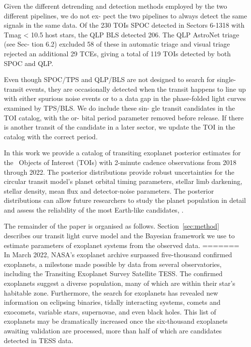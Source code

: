 \documentclass[floatfix,ApJL,twocolumn]{aastex631}
\begin{document}
Given the different detrending and detection methods employed by the two different pipelines, we do not ex- pect the two pipelines to always detect the same signals in the same data. Of the 230 TOIs SPOC detected in Sectors 6-1318 with Tmag < 10.5 host stars, the QLP BLS detected 206. The QLP AstroNet triage (see Sec- tion 6.2) excluded 58 of these in automatic triage and visual triage rejected an additional 29 TCEs, giving a total of 119 TOIs detected by both SPOC and QLP.

Even though SPOC/TPS and QLP/BLS are not designed to search for single-transit events, they are occasionally detected when the transit happens to line up with either spurious noise events or to a data gap in the phase-folded light curves examined by TPS/BLS. We do include these sin- gle transit candidates in the TOI catalog, with the or- bital period parameter removed before release. If there is another transit of the candidate in a later sector, we update the TOI in the catalog with the correct period.

In this work we provide a catalog of transiting exoplanet posterior estimates for the \red{\numAnalysed} \tess\ Objects of Interest (TOIs) with 2-minute cadence observations from 2018 through 2022.
The posterior distributions provide robust uncertainties for the circular transit model's planet orbital timing parameters, stellar limb darkening, stellar density, mean flux and detector-noise parameters.
The posterior distributions can allow future researchers to study the planet population in detail and assess the reliability of the most Earth-like candidates, .

The remainder of the paper is organised as follows. Section~\ref{sec:method} describes our transit light curve model and the Bayesian framework we use to estimate parameters of exoplanet systems from the observed data.
=======
In March 2022, NASA's exoplanet archive surpassed five-thousand confirmed exoplanets, a milestone made possible by data from several observatories, including the Transiting Exoplanet Survey Satellite TESS.
The confirmed exoplanets suggest a diverse population, many of which are within their star's habitable zone. 
Furthermore, the search for exoplanets has revealed new information on eclipsing binaries, tidally interacting systems,  comets and exocomets, variable stars, supernovae, and even black holes. 
This list of exoplanets may be dramatically increased once the six-thousand exoplanets awaiting validation are processed, more than half of which are candidates detected in TESS data.
\end{document}
